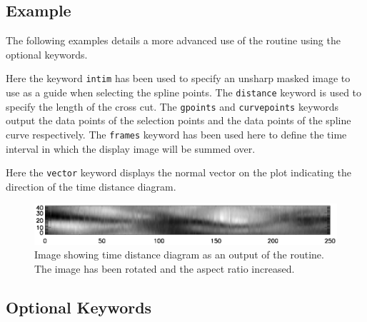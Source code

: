 \documentclass[11pt]{article}
\begin{document}
\newpage
\subsection{Example}
The following examples details a more advanced use of the routine using the optional keywords. 



Here the keyword \texttt{intim} has been used to specify an unsharp masked image to use as a guide when selecting the spline points. The \texttt{distance} keyword is used to specify the length of the cross cut. The \texttt{gpoints} and \texttt{curvepoints} keywords output the data points of the selection points and the data points of the spline curve respectively. The \texttt{frames} keyword has been used here to define the time interval in which the display image will be summed over.



Here the \texttt{vector} keyword displays the normal vector on the plot indicating the direction of the time distance diagram.



\begin{figure}[t!]
\centering
\includegraphics[scale=1, clip=true, viewport=1.5cm 5cm 18cm 8cm]{td}
\caption{Image showing time distance diagram as an output of the routine. The image has been rotated and the aspect ratio increased.\tiny}
\label{td}
\end{figure}

\newpage
\subsection{Optional Keywords}
\end{document}
